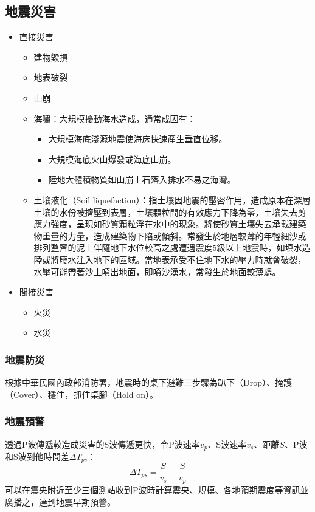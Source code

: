 \documentclass[a4paper,12pt]{report}
\begin{document}
\subsection{地震災害}
\begin{itemize}
\item 直接災害
\begin{itemize}
\item 建物毀損
\item 地表破裂
\item 山崩
\item 海嘯：大規模擾動海水造成，通常成因有：
\begin{itemize}
\item 大規模海底淺源地震使海床快速產生垂直位移。
\item 大規模海底火山爆發或海底山崩。
\item 陸地大體積物質如山崩土石落入排水不易之海灣。
\end{itemize}
\item 土壤液化（Soil liquefaction）：指土壤因地震的壓密作用，造成原本在深層土壤的水份被擠壓到表層，土壤顆粒間的有效應力下降為零，土壤失去剪應力強度，呈現如砂質顆粒浮在水中的現象。將使砂質土壤失去承載建築物重量的力量，造成建築物下陷或傾斜。常發生於地層較薄的年輕細沙或排列整齊的泥土伴隨地下水位較高之處遭遇震度5級以上地震時，如填水造陸或將廢水注入地下的區域。當地表承受不住地下水的壓力時就會破裂，水壓可能帶著沙土噴出地面，即噴沙湧水，常發生於地面較薄處。
\end{itemize}
\item 間接災害
\begin{itemize}
\item 火災
\item 水災
\end{itemize}
\end{itemize}
\subsubsection{地震防災}
根據中華民國內政部消防署，地震時的桌下避難三步驟為趴下（Drop）、掩護（Cover）、穩住，抓住桌腳（Hold on）。
\subsubsection{地震預警}
透過P波傳遞較造成災害的S波傳遞更快，令P波速率$v_p$、S波速率$v_s$、距離$S$、P波和S波到他時間差$\Delta T_{ps}$：
\[\Delta T_{ps}=\frac{S}{v_s}-\frac{S}{v_p}\]
可以在震央附近至少三個測站收到P波時計算震央、規模、各地預期震度等資訊並廣播之，達到地震早期預警。
\end{document}
